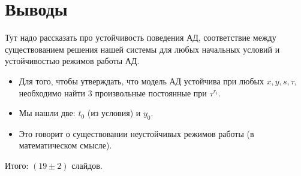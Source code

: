 \section{Выводы}

Тут надо рассказать про устойчивость поведения АД, соответствие между существованием решения нашей системы для любых начальных условий и устойчивостью режимов работы АД. 

\begin{itemize}

\item
Для того, чтобы утверждать, что модель АД устойчива при любых $x, y, s, \tau $, необходимо найти 3 произвольные постоянные при $ \tau^{r_i} $.

\item
Мы нашли две: $ t_0 $ (из условия) и $ y_0 $.

\item
Это говорит о существовании неустойчивых режимов работы (в математическом смысле).

\end{itemize}

\vspace{4mm}
\begin{center}
Итого: $ ( 19 \pm 2 ) $ слайдов.
\end{center}
